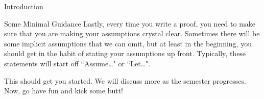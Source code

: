 \begin{chapter}{Introduction}
\begin{section}{Some Minimal Guidance}
Lastly, every time you write a proof, you need to make sure that you are making your assumptions crystal clear.  Sometimes there will be some implicit assumptions that we can omit, but at least in the beginning, you should get in the habit of stating your assumptions up front.  Typically, these statements will start off ``Assume\ldots" or ``Let\ldots".  

This should get you started.  We will discuss more as the semester progresses.  Now, go have fun and kick some butt!

\end{section}

\end{chapter}